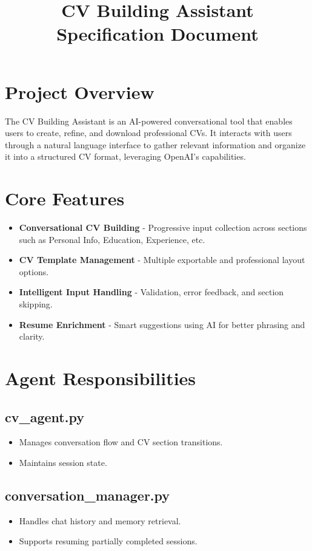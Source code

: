 \documentclass[11pt]{article}
\title{CV Building Assistant \\ \large Specification Document}
\author{}
\date{}
\begin{document}
\maketitle

\section{Project Overview}
The CV Building Assistant is an AI-powered conversational tool that enables users to create, refine, and download professional CVs. It interacts with users through a natural language interface to gather relevant information and organize it into a structured CV format, leveraging OpenAI's capabilities.

\section{Core Features}

\begin{itemize}[leftmargin=1.5em]
    \item \textbf{Conversational CV Building} - Progressive input collection across sections such as Personal Info, Education, Experience, etc.
    \item \textbf{CV Template Management} - Multiple exportable and professional layout options.
    \item \textbf{Intelligent Input Handling} - Validation, error feedback, and section skipping.
    \item \textbf{Resume Enrichment} - Smart suggestions using AI for better phrasing and clarity.
\end{itemize}

\section{Agent Responsibilities}

\subsection{cv\_agent.py}
\begin{itemize}
    \item Manages conversation flow and CV section transitions.
    \item Maintains session state.
\end{itemize}

\subsection{conversation\_manager.py}
\begin{itemize}
    \item Handles chat history and memory retrieval.
    \item Supports resuming partially completed sessions.
\end{itemize}
\end{document}

